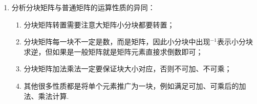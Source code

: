 \begin{enumerate}
          \begin{solution}
              本题我们使用的方法非常直接，就是直接设出$A^{-1}$的形式，然后验证即可. 之后我们还会学习一种基于分块矩阵初等变换的进阶方法（事实上考试如果考察的话基本是本题的解法，分块矩阵初等变换是在教材中是小字部分）. 设$A^{-1}=\begin{pmatrix}
                      X & Y \\ Z & T
                  \end{pmatrix}$，其中$X,T$分别为$k,m$阶矩阵，那么我们有
              \[\begin{pmatrix}
                      B & O \\ C & D
                  \end{pmatrix}\begin{pmatrix}
                      X & Y \\ Z & T
                  \end{pmatrix}=\begin{pmatrix}
                      BX & BY \\ CX+DZ & CY+DT
                  \end{pmatrix}=\begin{pmatrix}
                      E_k & O \\ O & E_m
                  \end{pmatrix},\]
              又由题意$A$可逆，$B,D$可逆，因此$BX=E_k$可得$X=B^{-1}$，$BY=O$可得$Y=O$，$CY+DT=DT=E_m$可得$T=D^{-1}$，$CX+DZ=CB^{-1}+DZ=O$可得$Z=-D^{-1}CB^{-1}$，因此
              \[A^{-1}=\begin{pmatrix}
                      B^{-1} & O \\ -D^{-1}CB^{-1} & D^{-1}
                  \end{pmatrix}.\]
          \end{solution}

          上述求解过程其实蕴含了一点：按照上述分块方式，$A$ 可逆当且仅当 $B,D$ 可逆.

    \item 分析分块矩阵与普通矩阵的运算性质的异同：
          \begin{enumerate}
              \item 分块矩阵转置需要注意大矩阵小分块都要转置；

              \item 分块矩阵每一块不一定是数，而是矩阵，因此小分块中出现$^{-1}$表示小分块求逆，但如果是一般矩阵就是矩阵元素直接求倒数即可；

              \item 分块矩阵加法乘法一定要保证块大小对应，否则不可加、不可乘；

              \item 其他很多性质都是将单个元素推广为一块，例如满足可加、可乘后的加法、乘法计算.
          \end{enumerate}
\end{enumerate}

